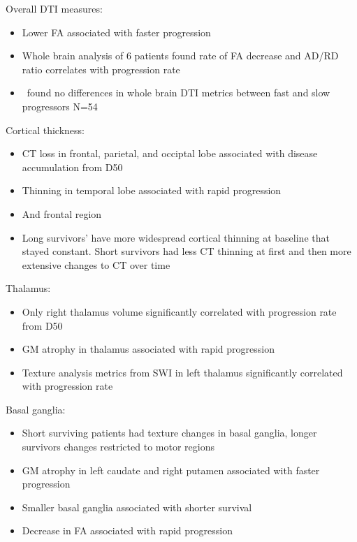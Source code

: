 Overall DTI measures:
\begin{itemize}
    \item Lower FA associated with faster progression~\cite{sendaStructuralMRICorrelates2017}
    \item Whole brain analysis of 6 patients found rate of FA decrease and AD/RD ratio correlates with progression rate~\cite{baldaranovLongitudinalDiffusionTensor2017}
    \item \cite{trojsiRestingStateFunctional2021}~found no differences in whole brain DTI metrics between fast and slow progressors N=54
\end{itemize}

Cortical thickness:
\begin{itemize}
    \item CT loss in frontal, parietal, and occiptal lobe associated with disease accumulation from D50~\cite{dieckmannCorticalSubcorticalGrey2022}
    \item Thinning in temporal lobe associated with rapid progression~\cite{dambrosioFrontotemporalCorticalThinning2014, verstraeteStructuralMRIReveals2012}
    \item And frontal region~\cite{verstraeteStructuralMRIReveals2012}
    \item Long survivors' have more widespread cortical thinning at baseline that stayed constant. Short survivors had less CT thinning at first and then more extensive changes to CT over time~\cite{burghMultimodalLongitudinalStudy2020}
\end{itemize}

\noindent {}
Thalamus:
\begin{itemize}
    \item Only right thalamus volume significantly correlated with progression rate from D50~\cite{dieckmannCorticalSubcorticalGrey2022}
    \item GM atrophy in thalamus associated with rapid progression~\cite{sendaStructuralMRICorrelates2017}
    \item Texture analysis metrics from SWI in left thalamus significantly correlated with progression rate~\cite{johnsQuantifyingChangesSusceptibility2019}
\end{itemize}

Basal ganglia:
\begin{itemize}
    \item Short surviving patients had texture changes in basal ganglia, longer survivors changes restricted to motor regions~\cite{ishaqueEvaluatingCerebralCorrelates2018}
    \item GM atrophy in left caudate and right putamen associated with faster progression~\cite{agostaLongitudinalAssessmentGrey2009}
    \item Smaller basal ganglia associated with shorter survival~\cite{westenengSubcorticalStructuresAmyotrophic2015}
    \item Decrease in FA associated with rapid progression~\cite{sendaStructuralMRICorrelates2017}
\end{itemize}

